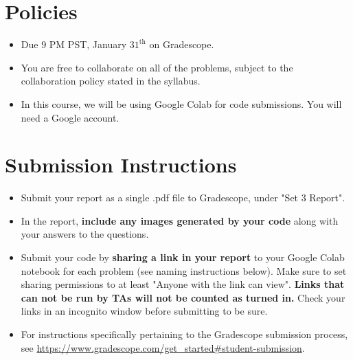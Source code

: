 \newif\ifshowsolutions
\showsolutionstrue






\DeclareMathOperator{\sign}{sign}


\pagestyle{fancy}




\section*{Policies}
\begin{itemize}
	\item Due 9 PM PST, January $31^\text{th}$ on Gradescope. 
	\item You are free to collaborate on all of the problems, subject to the collaboration policy stated in the syllabus.
	\item In this course, we will be using Google Colab for code submissions. You will need a Google account.
\end{itemize}

\section*{Submission Instructions}
\begin{itemize}
	\item Submit your report as a single .pdf file to Gradescope, under "Set 3 Report". 
	\item In the report, \textbf{include any images generated by your code} along with your answers to the questions.
	\item Submit your code by \textbf{sharing a link in your report} to your Google Colab notebook for each problem (see naming instructions below). Make sure to set sharing permissions to at least "Anyone with the link can view". \textbf{Links that can not be run by TAs will not be counted as turned in.} Check your links in an incognito window before submitting to be sure. 
	\item For instructions specifically pertaining to the Gradescope submission process, see \url{https://www.gradescope.com/get_started#student-submission}.
\end{itemize}


